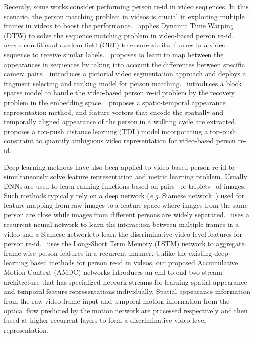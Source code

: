 \documentclass[journal]{IEEEtran}
\begin{document}
Recently, some works consider performing person re-id in video sequences. In this scenario, the person matching problem in videos is crucial in exploiting multiple frames in videos to boost the performance.~\cite{simonnet2012re} applies Dynamic Time Warping (DTW) to solve the sequence matching problem in video-based person re-id.~\cite{karaman2012identity} uses a conditional random field (CRF) to ensure similar frames in a video sequence to receive similar labels.~\cite{li2013locally} proposes to learn to map between the appearances in sequences by taking into account the differences between specific camera pairs.~\cite{wang2014person} introduces a pictorial video segmentation approach and deploys a fragment selecting and ranking model for person matching.~\cite{karanam2015sparse} introduces a block sparse model to handle the video-based person re-id problem by the recovery problem in the embedding space.~\cite{liu2015spatio} proposes a spatio-temporal appearance representation method, and feature vectors that encode the spatially and temporally aligned appearance of the person in a walking cycle are extracted.~\cite{you2016top} proposes a top-push distance learning (TDL) model incorporating a top-push constraint to quantify ambiguous video representation for video-based person re-id.

Deep learning methods have also been applied to video-based person re-id to simultaneously solve feature representation and metric learning problem. Usually DNNs are used to learn ranking functions based on pairs~\cite{yi2014deep} or triplets~\cite{ding2015deep} of images. Such methods typically rely on a deep network (\emph{e.g.} Siamese network~\cite{hadsell2006dimensionality}) used for feature mapping from raw images to a feature space where images from the same person are close while images from different persons are widely separated.~\cite{mclaughlinrecurrent} uses a recurrent neural network to learn the interaction between multiple frames in a video and a Siamese network to learn the discriminative video-level features for person re-id.~\cite{yan2016person} uses the Long-Short Term Memory (LSTM) network to aggregate frame-wise person features in a recurrent manner. Unlike the existing deep learning based methods for person re-id in videos, our proposed Accumulative Motion Context (AMOC) networks introduces an end-to-end two-stream architecture that has specialized network streams  for learning spatial appearance and temporal feature representations individually. Spatial appearance information from the raw video frame input and temporal motion information from the optical flow predicted by the motion network are processed respectively and then fused at  higher recurrent layers to form a discriminative video-level representation.
\end{document}
